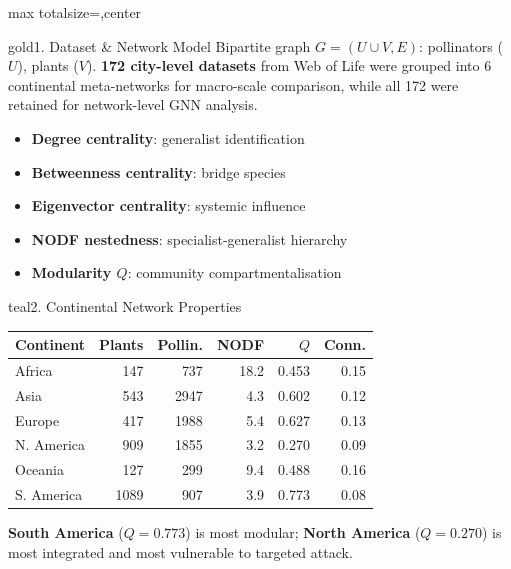 \documentclass[10pt]{article}
\begin{document}
\begin{adjustbox}{max totalsize={\textwidth}{\textheight},center}
\begin{minipage}{\textwidth}
\vspace{1.4mm}

\begin{minipage}[t]{0.327\textwidth}

\begin{card}{gold}{1. Dataset \& Network Model}
Bipartite graph $G=(U\cup V,E)$: pollinators ($U$), plants ($V$). \textbf{172 city-level datasets} from Web of Life were grouped into 6 continental meta-networks for macro-scale comparison, while all 172 were retained for network-level GNN analysis.

\begin{itemize}[leftmargin=*,nosep]
  \item \textbf{Degree centrality}: generalist identification
  \item \textbf{Betweenness centrality}: bridge species
  \item \textbf{Eigenvector centrality}: systemic influence
  \item \textbf{NODF nestedness}: specialist-generalist hierarchy
  \item \textbf{Modularity $Q$}: community compartmentalisation
\end{itemize}
\end{card}

\vspace{1.0mm}
\begin{card}{teal}{2. Continental Network Properties}
\footnotesize
\begin{tabularx}{\linewidth}{@{}lrrrrr@{}}
\toprule
Continent & Plants & Pollin. & NODF & $Q$ & Conn. \\
\midrule
Africa & 147 & 737 & 18.2 & 0.453 & 0.15 \\
Asia & 543 & 2947 & 4.3 & 0.602 & 0.12 \\
Europe & 417 & 1988 & 5.4 & 0.627 & 0.13 \\
N. America & 909 & 1855 & 3.2 & 0.270 & 0.09 \\
Oceania & 127 & 299 & 9.4 & 0.488 & 0.16 \\
S. America & 1089 & 907 & 3.9 & 0.773 & 0.08 \\
\bottomrule
\end{tabularx}

\vspace{0.5mm}
\textbf{South America} ($Q=0.773$) is most modular; \textbf{North America} ($Q=0.270$) is most integrated and most vulnerable to targeted attack.
\end{card}


\end{minipage}
\end{minipage}
\end{adjustbox}
\end{document}

